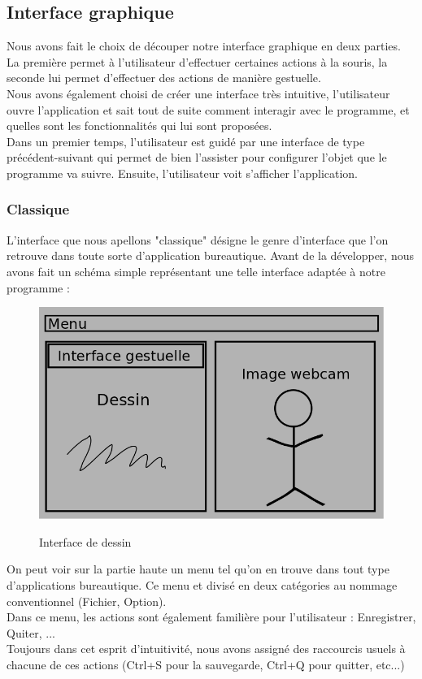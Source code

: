 \documentclass{report}
\begin{document}
		\subsection{Interface graphique}
			Nous avons fait le choix de découper notre interface graphique en deux parties. La première permet à l'utilisateur d'effectuer certaines actions à la souris, la seconde lui permet d'effectuer des actions de manière gestuelle. \\
			Nous avons également choisi de créer une interface très intuitive, l'utilisateur ouvre l'application et sait tout de suite comment interagir avec le programme, et quelles sont les fonctionnalités qui lui sont proposées. \\
			Dans un premier temps, l'utilisateur est guidé par une interface de type précédent-suivant qui permet de bien l'assister pour configurer l'objet que le programme va suivre. Ensuite, l'utilisateur voit s'afficher l'application.
			\subsubsection{Classique}
				L'interface que nous apellons "classique" désigne le genre d'interface que l'on retrouve dans toute sorte d'application bureautique. Avant de la développer, nous avons fait un schéma simple représentant une telle interface adaptée à notre programme : \\
			\begin{figure}[!h]
						\centering
						\includegraphics[scale=0.4]{../images/interface.png}\\
						\caption{Interface de dessin}
						\label{Interface de dessin}
			\end{figure}
			
			On peut voir sur la partie haute un menu tel qu'on en trouve dans tout type d'applications bureautique. Ce menu et divisé en deux catégories au nommage conventionnel (Fichier, Option). \\
			Dans ce menu, les actions sont également familière pour l'utilisateur : Enregistrer, Quiter, ... \\
			Toujours dans cet esprit d'intuitivité, nous avons assigné des raccourcis usuels à chacune de ces actions (Ctrl+S pour la sauvegarde, Ctrl+Q pour quitter, etc...)
			
\end{document}
